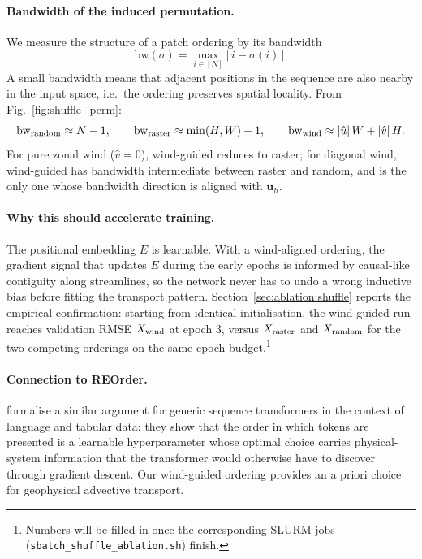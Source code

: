 \paragraph{Bandwidth of the induced permutation.}
We measure the structure of a patch ordering by its bandwidth
\begin{equation}
\mathrm{bw}(\sigma) = \max_{i \in [N]} \big|\,i - \sigma(i)\,\big|.
\end{equation}
A small bandwidth means that adjacent positions in the sequence are
also nearby in the input space, i.e.\ the ordering preserves spatial
locality. From Fig.~\ref{fig:shuffle_perm}:
\begin{equation*}
\mathrm{bw}_{\rm random} \approx N-1, \qquad
\mathrm{bw}_{\rm raster} \approx \min(H,W)+1, \qquad
\mathrm{bw}_{\rm wind} \approx |\hat{u}|\,W + |\hat{v}|\,H.
\end{equation*}
For pure zonal wind ($\hat{v}=0$), wind-guided reduces to raster;
for diagonal wind, wind-guided has bandwidth intermediate between
raster and random, and is the only one whose bandwidth direction is
aligned with $\mathbf{u}_h$.

\paragraph{Why this should accelerate training.}
The positional embedding $E$ is learnable. With a wind-aligned
ordering, the gradient signal that updates $E$ during the early
epochs is informed by causal-like contiguity along streamlines, so the
network never has to undo a wrong inductive bias before fitting the
transport pattern. Section~\ref{sec:ablation:shuffle} reports the
empirical confirmation: starting from identical initialisation, the
wind-guided run reaches validation RMSE $X_{\rm wind}$ at epoch 3,
versus $X_{\rm raster}$ and $X_{\rm random}$ for the two competing
orderings on the same epoch budget.\footnote{Numbers will be filled in
once the corresponding SLURM jobs (\texttt{sbatch\_shuffle\_ablation.sh})
finish.}

\paragraph{Connection to REOrder.}
\citet{goyal2024reorder} formalise a similar argument for generic
sequence transformers in the context of language and tabular data:
they show that the order in which tokens are presented is a learnable
hyperparameter whose optimal choice carries physical-system information
that the transformer would otherwise have to discover through gradient
descent. Our wind-guided ordering provides an a priori choice for
geophysical advective transport.

